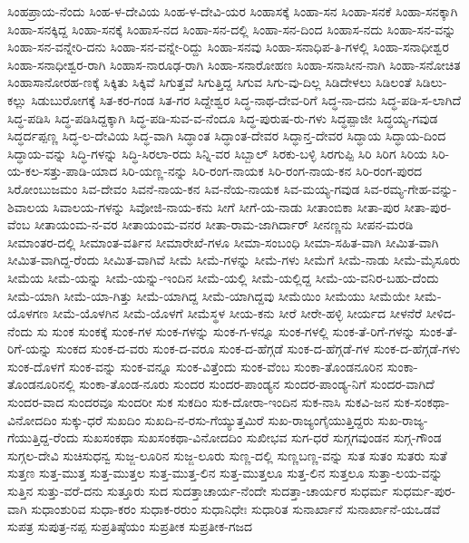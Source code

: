 {ಸಿಂಹಪ್ರಾಯ-ನೆಂದು
ಸಿಂಹ-ಳ-ದೇವಿಯ
ಸಿಂಹ-ಳ-ದೇವಿ-ಯರ
ಸಿಂಹಾಸಕ್ಕೆ
ಸಿಂಹಾ-ಸನ
ಸಿಂಹಾ-ಸನಕೆ
ಸಿಂಹಾ-ಸನಕ್ಕಾಗಿ
ಸಿಂಹಾ-ಸನಕ್ಕಿದ್ದ
ಸಿಂಹಾ-ಸನಕ್ಕೆ
ಸಿಂಹಾಸ-ನದ
ಸಿಂಹಾ-ಸನ-ದಲ್ಲಿ
ಸಿಂಹಾ-ಸನ-ದಿಂದ
ಸಿಂಹಾಸ-ನದು
ಸಿಂಹಾ-ಸನ-ವನ್ನು
ಸಿಂಹಾ-ಸನ-ವನ್ನೇರಿ-ದನು
ಸಿಂಹಾ-ಸನ-ವನ್ನೇ-ರಿದ್ದು
ಸಿಂಹಾ-ಸನವು
ಸಿಂಹಾ-ಸನಾಧಿಪ-ತಿ-ಗಳಲ್ಲಿ
ಸಿಂಹಾ-ಸನಾಧೀಶ್ವರ
ಸಿಂಹಾ-ಸನಾಧೀಶ್ವರ-ರಾಗಿ
ಸಿಂಹಾಸ-ನಾರೂಢ-ರಾಗಿ
ಸಿಂಹಾ-ಸನಾರೋಹಣ
ಸಿಂಹಾ-ಸನಾಸೀನ-ನಾಗಿ
ಸಿಂಹಾ-ಸನೋಚಿತ
ಸಿಂಹಾಸಾನೋರಹ-ಣಕ್ಕೆ
ಸಿಕ್ಕಿತು
ಸಿಕ್ಕಿವೆ
ಸಿಗುತ್ತವೆ
ಸಿಗುತ್ತಿದ್ದ
ಸಿಗುವ
ಸಿಗು-ವು-ದಿಲ್ಲ
ಸಿಡಿದೇಳಲು
ಸಿಡಿಲಂತೆ
ಸಿಡಿಲು-ಕಲ್ಲು
ಸಿಡುಬುರೋಗಕ್ಕೆ
ಸಿತ-ಕರ-ಗಂಡ
ಸಿತ-ಗರ
ಸಿದ್ದೇಶ್ವರ
ಸಿದ್ಧ-ನಾಥ-ದೇವ-ರಿಗೆ
ಸಿದ್ಧ-ನಾ-ದನು
ಸಿದ್ಧ-ಪಡಿ-ಸ-ಲಾಗಿದೆ
ಸಿದ್ಧ-ಪಡಿಸಿ
ಸಿದ್ಧ-ಪಡಿಸಿದ್ದಕ್ಕಾಗಿ
ಸಿದ್ಧ-ಪಡಿ-ಸುವ-ವ-ನೆಂದೂ
ಸಿದ್ಧ-ಪುರುಷ-ರು-ಗಳು
ಸಿದ್ಧಪ್ಪಾಜೀ
ಸಿದ್ಧಯ್ಯ-ಗವುಡ
ಸಿದ್ಧರ್ದಪ್ಪಣ್ಣ
ಸಿದ್ಧ-ಲ-ದೇವಿಯ
ಸಿದ್ಧ-ವಾಗಿ
ಸಿದ್ಧಾಂತ
ಸಿದ್ಧಾಂತ-ದೇವರ
ಸಿದ್ಧಾನ್ತ-ದೇವರ
ಸಿದ್ಧಾಯ
ಸಿದ್ಧಾಯ-ದಿಂದ
ಸಿದ್ಧಾಯ-ವನ್ನು
ಸಿದ್ಧಿ-ಗಳನ್ನು
ಸಿದ್ಧಿ-ಸಿರಲಾ-ರದು
ಸಿನ್ನಿ-ವರ
ಸಿಬ್ಬಾಲ್
ಸಿರಕು-ಬಳ್ಳಿ
ಸಿರಗುಪ್ಪಿ
ಸಿರಿ
ಸಿರಿಗ
ಸಿರಿಯ
ಸಿರಿ-ಯ-ಕಲ-ಸತ್ತು-ಪಾಡಿ-ಯಾದ
ಸಿರಿ-ಯಣ್ಣ-ನನ್ನು
ಸಿರಿ-ರಂಗ-ನಾಯಕ
ಸಿರಿ-ರಂಗ-ನಾಯ-ಕನ
ಸಿರಿ-ರಂಗ-ಪುರದ
ಸಿರೋಂಬುಜಮಂ
ಸಿವ-ದೇವಂ
ಸಿವನೆ-ನಾಯ-ಕನ
ಸಿವ-ನೆಯ-ನಾಯಕ
ಸಿವ-ಮಯ್ಯ-ಗವುಡ
ಸಿವ-ರಮ್ಯ-ಗೇಹ-ವನ್ನು-ಶಿವಾಲಯ
ಸಿವಾಲಯ-ಗಳನ್ನು
ಸಿವೋಜಿ-ನಾಯ-ಕನು
ಸೀಗೆ
ಸೀಗೆ-ಯ-ನಾಡು
ಸೀತಾಂಬಿಕಾ
ಸೀತಾ-ಪುರ
ಸೀತಾ-ಪುರ-ವೆಂಬ
ಸೀತಾಯಂಮ-ನ-ವರ
ಸೀತಾಯಂಮ-ವನರ
ಸೀತಾ-ರಾಮ-ಜಾಗಿರ್ದಾರ್
ಸೀನಣ್ಣನು
ಸೀಪನ-ಮರಡಿ
ಸೀಮಾಂತರ-ದಲ್ಲಿ
ಸೀಮಾಂತ-ವರ್ತಿನ
ಸೀಮಾರೇಖೆ-ಗಳೂ
ಸೀಮಾ-ಸಂಬಂಧಿ
ಸೀಮಾ-ಸಹಿತ-ವಾಗಿ
ಸೀಮಿತ-ವಾಗಿ
ಸೀಮಿತ-ವಾಗಿದ್ದ-ರೆಂದು
ಸೀಮಿತ-ವಾಗಿವೆ
ಸೀಮೆ
ಸೀಮೆ-ಗಳನ್ನು
ಸೀಮೆ-ಗಳು
ಸೀಮೆಗೆ
ಸೀಮೆ-ನಾಡು
ಸೀಮೆ-ಮೈಸೂರು
ಸೀಮೆಯ
ಸೀಮೆ-ಯನ್ನು
ಸೀಮೆ-ಯನ್ನು-ಇಂದಿನ
ಸೀಮೆ-ಯಲ್ಲಿ
ಸೀಮೆ-ಯಲ್ಲಿದ್ದ
ಸೀಮೆ-ಯ-ವನಿರ-ಬಹು-ದೆಂದು
ಸೀಮೆ-ಯಾಗಿ
ಸೀಮೆ-ಯಾ-ಗಿತ್ತು
ಸೀಮೆ-ಯಾಗಿದ್ದ
ಸೀಮೆ-ಯಾಗಿದ್ದವು
ಸೀಮೆಯಿಂ
ಸೀಮೆಯು
ಸೀಮೆಯೇ
ಸೀಮೆ-ಯೊಳಗಣ
ಸೀಮೆ-ಯೊಳಗಿನ
ಸೀಮೆ-ಯೊಳಗೆ
ಸೀಮೆಸ್ಥಳ
ಸೀಯ-ಕನು
ಸೀರೆ
ಸೀರೇ-ಹಳ್ಳಿ
ಸೀರ್ಯದ
ಸೀಳನೆರೆ
ಸೀಳಿದ-ನೆಂದು
ಸು
ಸುಂಕ
ಸುಂಕಕ್ಕೆ
ಸುಂಕ-ಗಳ
ಸುಂಕ-ಗಳನ್ನು
ಸುಂಕ-ಗ-ಳನ್ನೂ
ಸುಂಕ-ಗಳಲ್ಲಿ
ಸುಂಕ-ತೆ-ರಿಗೆ-ಗಳನ್ನು
ಸುಂಕ-ತೆ-ರಿಗೆ-ಯನ್ನು
ಸುಂಕದ
ಸುಂಕ-ದ-ವರು
ಸುಂಕ-ದ-ವರೂ
ಸುಂಕ-ದ-ಹೆಗ್ಗಡೆ
ಸುಂಕ-ದ-ಹೆಗ್ಗಡೆ-ಗಳ
ಸುಂಕ-ದ-ಹೆಗ್ಗಡೆ-ಗಳು
ಸುಂಕ-ದೊಳಗೆ
ಸುಂಕ-ವನ್ನು
ಸುಂಕ-ವನ್ನೂ
ಸುಂಕ-ವಿತ್ತೆಂದು
ಸುಂಕ-ವೆಂಬ
ಸುಂಕಾ-ತೊಂಡನೂರಿನ
ಸುಂಕಾ-ತೊಂಡನೂರಿನಲ್ಲಿ
ಸುಂಕಾ-ತೊಂಡ-ನೂರು
ಸುಂದರ
ಸುಂದರ-ಪಾಂಡ್ಯನ
ಸುಂದರ-ಪಾಂಡ್ಯ-ನಿಗೆ
ಸುಂದರ-ವಾಗಿದೆ
ಸುಂದರ-ವಾದ
ಸುಂದರವೂ
ಸುಂದರೀ
ಸುಕ
ಸುಕದಿಂ
ಸುಕ-ದೋರಾ-ಇಂದಿನ
ಸುಕ-ನಾಸಿ
ಸುಕವಿ-ಜನ
ಸುಕ-ಸಂಕಥಾ-ವಿನೋದದಿಂ
ಸುಕ್ಕು-ಧರೆ
ಸುಖದಿಂ
ಸುಖದಿ-ನ-ರಸು-ಗೆಯ್ಯುತ್ತಮಿರೆ
ಸುಖ-ರಾಜ್ಯಂಗೈಯುತ್ತಿದ್ದರು
ಸುಖ-ರಾಜ್ಯ-ಗೆಯುತ್ತಿದ್ದ-ರೆಂದು
ಸುಖಸಂಕಥಾ
ಸುಖಸಂಕಥಾ-ವಿನೋದದಿಂ
ಸುಖೀಭವ
ಸುಗ-ಧರೆ
ಸುಗ್ಗಗವುಂಡನ
ಸುಗ್ಗ-ಗೌಂಡ
ಸುಗ್ಗಲ-ದೇವಿ
ಸುಚಿಸುಧನ್ವ
ಸುಜ್ಜ-ಲೂರಿನ
ಸುಜ್ಜ-ಲೂರು
ಸುಣ್ಣ-ದಲ್ಲಿ
ಸುಣ್ಣಬಣ್ಣ-ವನ್ನು
ಸುತ
ಸುತಂ
ಸುತರು
ಸುತೆ
ಸುತ್ತಣ
ಸುತ್ತ-ಮುತ್ತ
ಸುತ್ತ-ಮುತ್ತಲ
ಸುತ್ತ-ಮುತ್ತ-ಲಿನ
ಸುತ್ತ-ಮುತ್ತಲೂ
ಸುತ್ತ-ಲಿನ
ಸುತ್ತಲೂ
ಸುತ್ತಾ-ಲಯ-ವನ್ನು
ಸುತ್ತಿನ
ಸುತ್ತು-ವರೆ-ದನು
ಸುತ್ತೂರು
ಸುದ
ಸುದತ್ತಾಚಾರ್ಯ-ನೆಂದೇ
ಸುದತ್ತಾ-ಚಾರ್ಯರ
ಸುಧರ್ಮ
ಸುಧರ್ಮ-ಪುರ-ವಾಗಿ
ಸುಧಾಂಶುರಿವ
ಸುಧಾ-ಕರಂ
ಸುಧಾಕ-ರರುಂ
ಸುಧಾನಿಧೇಃ
ಸುಧಾರಿತ
ಸುನಾರ್ಖಾನೆ
ಸುನಾರ್ಖಾನೆ-ಯಒಡವೆ
ಸುಪತ್ರ
ಸುಪುತ್ರ-ನಪ್ಪ
ಸುಪ್ರತಿಷ್ಠೆಯಂ
ಸುಪ್ರತೀಕ
ಸುಪ್ರತೀಕ-ಗಜದ
}
